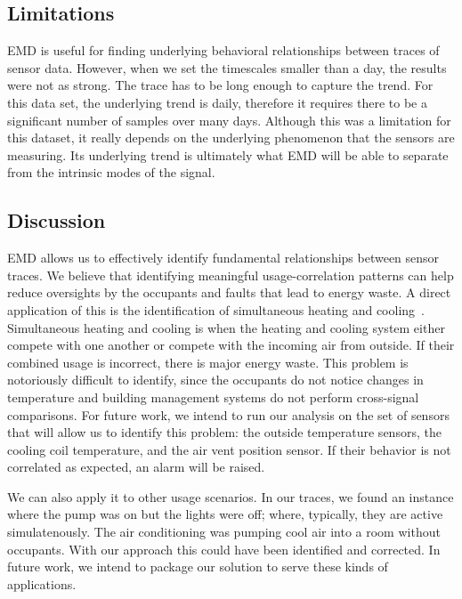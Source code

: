 \subsection{Limitations}
EMD is useful for finding underlying behavioral relationships between traces of sensor data.  However,
when we set the timescales smaller than a day, the results were not as strong.
The trace has to be long enough to capture the trend.  For this data set, the underlying
trend is daily, therefore it requires there to be a significant number of samples over many days.
Although this was a limitation for this dataset, it really depends on the underlying phenomenon that
the sensors are measuring.  Its underlying trend is ultimately what EMD will be able to separate
from the intrinsic modes of the signal.

\subsection{Discussion}
EMD allows us to effectively identify fundamental relationships between sensor traces.
We believe that identifying meaningful usage-correlation patterns can help reduce oversights
by the occupants and faults that lead to energy waste.  A direct application of this is the identification
of simultaneous heating and cooling~\cite{simheatcool}.  Simultaneous heating and cooling is when the heating
and cooling system either compete with one another or compete with the incoming air from outside.  If
their combined usage is incorrect, there is major energy waste.
This problem is notoriously difficult to identify, since the occupants do not notice
changes in temperature and building management systems do not perform cross-signal comparisons.  For 
future work, we intend to run our analysis on the set of sensors that will
allow us to identify this problem: the outside temperature sensors, the cooling
coil temperature, and the air vent position sensor.  If their behavior
is not correlated as expected, an alarm will be raised.

We can also apply it to other usage scenarios.  In our traces, we found an instance where the pump
was on but the lights were off; where, typically, they are active simulatenously.
The air conditioning was pumping cool air into a room without occupants.
With our approach this could have been identified and corrected.  In future work, we intend to
package our solution to serve these kinds of applications.

